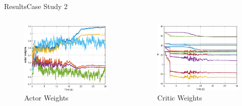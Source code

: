\documentclass{beamer}
\begin{document}
\begin{frame}{Results}{Case Study 2}
\begin{columns}
\begin{column}{0.5\textwidth}
\begin{figure}
\includegraphics[scale=0.4]{figs/matlab/actorCritic/CaseStudy2/weightActor.eps}
\caption{Actor Weights}
\end{figure}
\end{column}

\begin{column}{0.5\textwidth}
\begin{center}

\begin{figure}
\includegraphics[scale=0.4]{figs/matlab/actorCritic/CaseStudy2/weightCritic.eps}
\caption{Critic Weights}
\end{figure}
\end{center}

\end{column}

\end{columns}

\end{frame}
\end{document}
